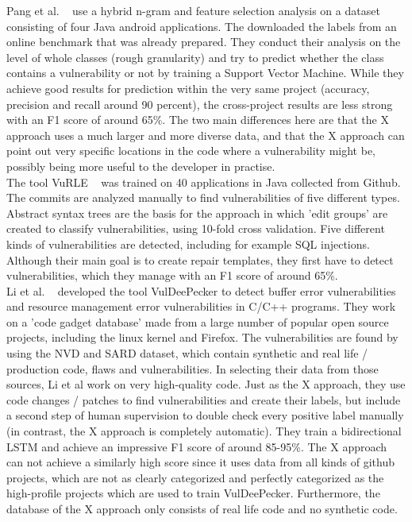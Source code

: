 \documentclass[
	a4paper,
	pagesize,
	pdftex,
	12pt,
	twoside, %
	BCOR=5mm, %
	ngerman,
	fleqn,
	final,
	]{scrartcl}
\begin{document}
Pang et al. ~\cite{Pang.2015} use a hybrid n-gram and feature selection analysis on a dataset consisting of four Java android applications. The downloaded the labels from an online benchmark that was already prepared. They conduct their analysis on the level of whole classes (rough granularity) and try to predict whether the class contains a vulnerability or not by training a Support Vector Machine. While they achieve good results for prediction within the very same project (accuracy, precision and recall around 90 percent), the cross-project results are less strong with an F1 score of around 65\%. The two main differences here are that the X approach uses a much larger and more diverse data, and that the X approach can point out very specific locations in the code where a vulnerability might be, possibly being more useful to the developer in practise.\\

The tool VuRLE ~\cite{Ma.2017} was trained on 40 applications in Java collected from Github. The commits are analyzed manually to find vulnerabilities of five different types. Abstract syntax trees are the basis for the approach in which 'edit groups' are created to classify vulnerabilities, using 10-fold cross validation. Five different kinds of vulnerabilities are detected, including for example SQL injections. Although their main goal is to create repair templates, they first have to detect vulnerabilities, which they manage with an F1 score of around 65\%. \\

Li et al. ~\cite{Li.2018} developed the tool VulDeePecker to detect buffer error vulnerabilities and resource management error vulnerabilities in C/C++ programs. They work on a 'code gadget database' made from a large number of popular open source projects, including the linux kernel and Firefox. The vulnerabilities are found by using the NVD and SARD dataset, which contain synthetic and real life / production code, flaws and vulnerabilities. In selecting their data from those sources, Li et al work on very high-quality code. Just as the X approach, they use code changes / patches to find vulnerabilities and create their labels, but include a second step of human supervision to double check every positive label manually (in contrast, the X approach is completely automatic). They train a bidirectional LSTM and achieve an impressive F1 score of around 85-95\%. The X approach can not achieve a similarly high score since it uses data from all kinds of github projects, which are not as clearly categorized and perfectly categorized as the high-profile projects which are used to train VulDeePecker. Furthermore, the database of the X approach only consists of real life code and no synthetic code.\\
\end{document}
